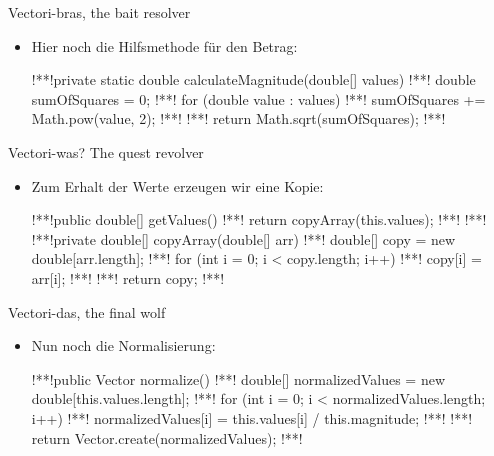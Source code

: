 \begin{frame}[fragile]{Vectori-bras, the bait resolver}
    \begin{itemize}[<+(1)->]
        \item Hier noch die Hilfsmethode für den Betrag:
\begin{plainjava}
!**!private static double calculateMagnitude(double[] values) {
!**!    double sumOfSquares = 0;
!**!    for (double value : values) {
!**!        sumOfSquares += Math.pow(value, 2);
!**!    }
!**!    return Math.sqrt(sumOfSquares);
!**!}
\end{plainjava}
    \end{itemize}
\end{frame}

\begin{frame}[fragile]{Vectori-was? The quest revolver}
    \begin{itemize}[<+(1)->]
        \item Zum Erhalt der Werte erzeugen wir eine Kopie:
\begin{plainjava}
!**!public double[] getValues() {
!**!    return copyArray(this.values);
!**!}
!**!
!**!private double[] copyArray(double[] arr) {
!**!    double[] copy = new double[arr.length];
!**!    for (int i = 0; i < copy.length; i++) {
!**!        copy[i] = arr[i];
!**!    }
!**!    return copy;
!**!}
\end{plainjava}
    \end{itemize}
\end{frame}

\begin{frame}[fragile]{Vectori-das, the final wolf}
    \begin{itemize}[<+(1)->]
        \item Nun noch die Normalisierung:
\begin{plainjava}
!**!public Vector normalize() {
!**!    double[] normalizedValues = new double[this.values.length];
!**!    for (int i = 0; i < normalizedValues.length; i++) {
!**!        normalizedValues[i] = this.values[i] / this.magnitude;
!**!    }
!**!    return Vector.create(normalizedValues);
!**!}
\end{plainjava}
    \end{itemize}
\end{frame}


